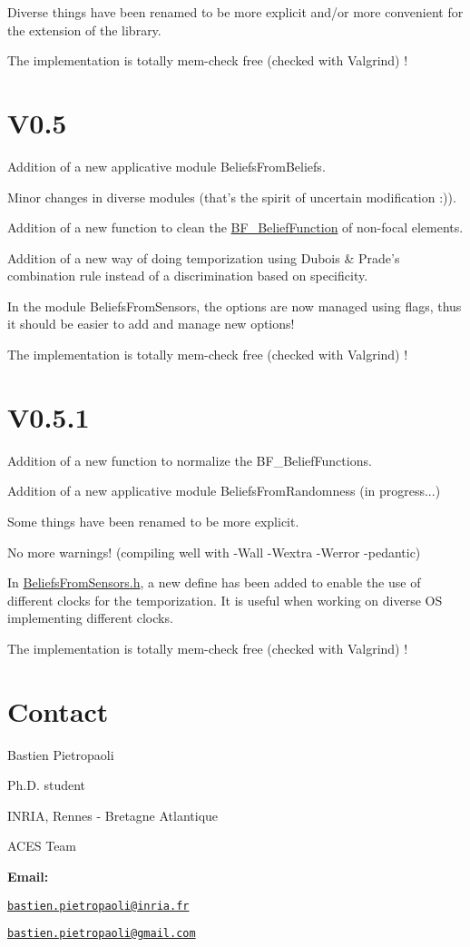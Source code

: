  Diverse things have been renamed to be more explicit and/or more convenient for the extension of the library. \par
 The implementation is totally mem-\/check free (checked with Valgrind) ! \par
\hypertarget{version_sec_v05_subsec}{}\section{V0.5}\label{version_sec_v05_subsec}
Addition of a new applicative module BeliefsFromBeliefs. \par
 Minor changes in diverse modules (that's the spirit of uncertain modification :)). \par
 Addition of a new function to clean the \hyperlink{struct_b_f___belief_function}{BF\_\-BeliefFunction} of non-\/focal elements. \par
 Addition of a new way of doing temporization using Dubois \& Prade's combination rule instead of a discrimination based on specificity. \par
 In the module BeliefsFromSensors, the options are now managed using flags, thus it should be easier to add and manage new options! \par
 The implementation is totally mem-\/check free (checked with Valgrind) ! \par
\hypertarget{version_sec_v051_subsec}{}\section{V0.5.1}\label{version_sec_v051_subsec}
Addition of a new function to normalize the BF\_\-BeliefFunctions. \par
 Addition of a new applicative module BeliefsFromRandomness (in progress...) \par
 Some things have been renamed to be more explicit. \par
 No more warnings! (compiling well with -\/Wall -\/Wextra -\/Werror -\/pedantic) \par
 In \hyperlink{_beliefs_from_sensors_8h}{BeliefsFromSensors.h}, a new define has been added to enable the use of different clocks for the temporization. It is useful when working on diverse OS implementing different clocks. \par
 The implementation is totally mem-\/check free (checked with Valgrind) ! \par
\hypertarget{version_sec_Version_contact}{}\section{Contact}\label{version_sec_Version_contact}
Bastien Pietropaoli \par
 Ph.D. student \par
 INRIA, Rennes -\/ Bretagne Atlantique \par
 ACES Team \par


{\bfseries Email:} \par
 \href{mailto:bastien.pietropaoli@inria.fr}{\tt bastien.pietropaoli@inria.fr} \par
 \href{mailto:bastien.pietropaoli@gmail.com}{\tt bastien.pietropaoli@gmail.com} \par
 